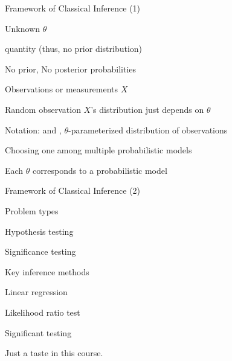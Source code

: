 \begin{frame}{Framework of Classical Inference (1)}

\plitemsep 0.08in

\begin{center}
\end{center}
\vspace{-0.5cm}
\bci
\item Unknown $\theta$

\bci
\item<2->  quantity (thus, no prior distribution)
\item<2-> No prior, No posterior probabilities
\eci



\item Observations or measurements $X$

\bci
\item<3-> Random observation $X$'s distribution just depends on $\theta$
\item<4-> Notation:  and , $\theta$-parameterized distribution of observations
\eci

\item<5-> Choosing one among multiple probabilistic models

\bci
\item Each $\theta$ corresponds to a probabilistic model
\eci

\eci


\end{frame}

\begin{frame}{Framework of Classical Inference (2)}

\plitemsep 0.1in

\bci
\item<2-> Problem types

\bci
\item {}
\item Hypothesis testing
\item Significance testing
\eci



\item<3-> Key inference methods

\bci
\item {}
\item Linear regression
\item Likelihood ratio test
\item Significant testing
\eci

\item<4-> Just a taste in this course.
\eci


\end{frame}

